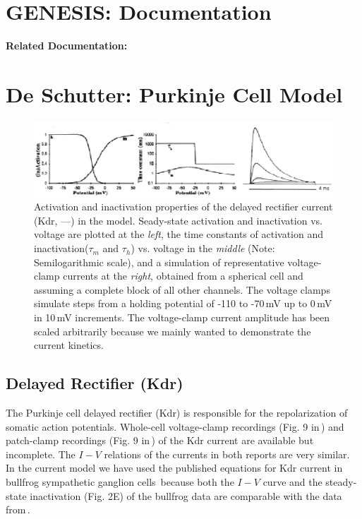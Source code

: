 \documentclass[12pt]{article}
\begin{document}
\section*{GENESIS: Documentation}

{\bf Related Documentation:}

\section*{De Schutter: Purkinje Cell Model}

\begin{figure}[h]
\centering
   \includegraphics[scale=0.75]{figures/DS1.2E1.eps}
   \caption{Activation and inactivation properties of the delayed rectifier current (Kdr, ---) in the model. Seady-state activation and inactivation vs. voltage are plotted at the {\em left}, the time constants of activation and inactivation($\tau_m$ and $\tau_h$) vs. voltage in the {\em middle} (Note: Semilogarithmic scale), and a simulation of representative voltage-clamp currents at the {\em right}, obtained from a spherical cell and assuming a complete block of all other channels.  The voltage clamps simulate steps from a holding potential of -110 to -70\,mV up to 0\,mV in 10\,mV increments. The voltage-clamp current amplitude has been scaled arbitrarily because we mainly wanted to demonstrate the current kinetics.}
   \label{fig:DS1.2E}
\end{figure}

\subsection*{Delayed Rectifier (Kdr)}

The Purkinje cell delayed rectifier (Kdr) is responsible for the repolarization of somatic action potentials. Whole-cell voltage-clamp recordings (Fig. 9 in\,\cite{Hirano:1989uq}) and patch-clamp recordings (Fig. 9 in\,\cite{Gahwiler:1989fk}) of the Kdr current are available but incomplete. The $I-V$ relations of the currents in both reports are very similar. In the current model we have used the published equations for Kdr current in bullfrog sympathetic ganglion cells\,\cite{Yamada-W:1989bs} because both the $I-V$ curve and the steady-state inactivation (Fig. 2E) of the bullfrog data are comparable with the data from\,\cite{Hirano:1989uq}.



\end{document}
